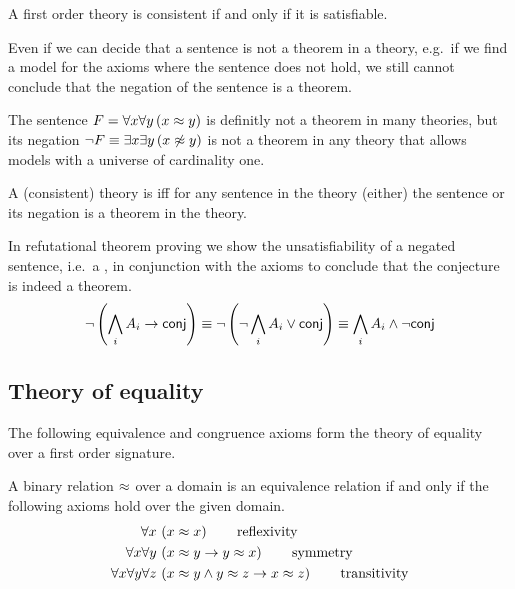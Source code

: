 \begin{lemma}
	A first order theory is consistent if and only if it is satisfiable.
\end{lemma}
%
Even if we can decide that a sentence is not a theorem in a theory,
e.g.~if we find a model for the axioms where the sentence does not hold,
we still cannot conclude that the negation of the sentence is a theorem.
\begin{example}
	The sentence \( F = \forall x \forall y\, (x\approx y) \) is definitly not a theorem in many theories, but its negation \( \lnot F \equiv \exists x \exists y\, (x \not\approx y) \) is not a theorem in any theory that allows models with a universe of cardinality one.
\end{example}
\begin{definition}
	A (consistent) theory is  iff for any sentence in the theory (either) the sentence or its negation is a theorem in the theory.
\end{definition}
%
\begin{remark}
In refutational theorem proving
we show the unsatisfiability
of a negated sentence,
i.e.~a ,
in conjunction with the axioms
to conclude that the conjecture is indeed a theorem.
\[
	\lnot\left(\bigwedge_i A_i \rightarrow \mathsf{conj}\right) \equiv
	\lnot\left(\lnot\bigwedge_i A_i \lor \mathsf{conj}\right) \equiv
	\bigwedge_i A_i \land \lnot \mathsf{conj}
\]
\end{remark}

\subsection{Theory of equality}

The following equivalence and congruence axioms form the theory of equality over a first order signature.

\begin{definition}
	[Equivalence] A binary relation \( \approx \) over a domain
	is an equivalence relation if and only if the following axioms hold over the given domain.\label{def:equivalence:axioms}
\begin{align*}
\forall x\,
&\left(x \approx x\right)
\tag*{reflexivity}
\\
\forall x \forall y\,
&\left(x \approx y \rightarrow y \approx x \right)
\tag*{symmetry}
\\
\forall x \forall y \forall z\,
&\left(x \approx y \land y\approx z \rightarrow x\approx z\right)
\tag*{transitivity}
\end{align*}
\end{definition}

